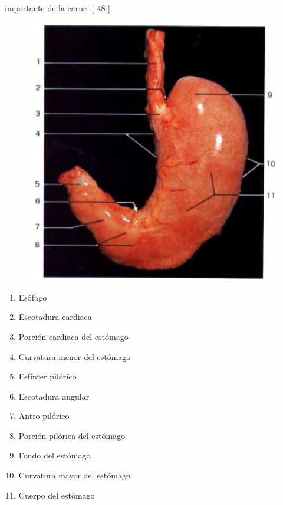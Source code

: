 importante de la carne. [ 48 ]\\
\begin{figure}[H]
	\begin{center}
 		\includegraphics[width = 1\textwidth]{v2/images/image2.png}
	\end{center} 
\end{figure}
\begin{enumerate}
    \item Esófago
    \item Escotadura cardiaca
    \item Porción cardiaca del estómago
    \item Curvatura menor del estómago
    \item Esfínter pilórico
    \item Escotadura angular
    \item Antro pilórico
    \item Porción pilórica del estómago
    \item Fondo del estómago
    \item Curvatura mayor del estómago 
    \item Cuerpo del estómago    
\end{enumerate}

